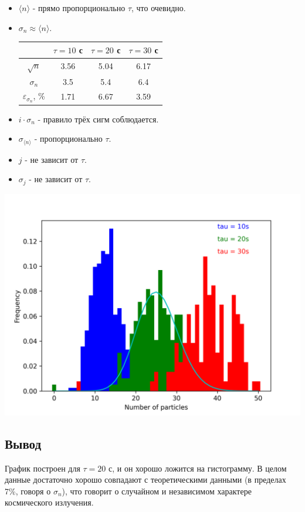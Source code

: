 \documentclass[12pt, a4paper]{article}
\begin{document}
\begin{itemize}
    \item $\langle n \rangle$ - прямо пропорционально $\tau$, что очевидно.
    \item $\sigma_n \approx \langle n \rangle$.
    \begin{center}
        \begin{tabular}{|c|c|c|c|}
            \hline
            & $\tau = 10$ с & $\tau = 20$ с & $\tau = 30$ с \\
            \hline
            $\sqrt{n}$ & 3.56 & 5.04 & 6.17 \\
            \hline
            $\sigma_n$ & 3.5 & 5.4 & 6.4 \\
            \hline
            $\varepsilon_{\sigma_n}$, \% & 1.71 & 6.67 & 3.59 \\ 
            \hline
        \end{tabular}
    \end{center}
    \item $i \cdot \sigma_n$ - правило трёх сигм соблюдается.
    \item $\sigma_{\langle n \rangle}$ - пропорционально $\tau$.
    \item $j$ - не зависит от $\tau$.
    \item $\sigma_j$ - не зависит от $\tau$.
\end{itemize}

\begin{center}
    \includegraphics[width=\textwidth]{Figure good}
\end{center}

\subsection{Вывод}

График построен для $\tau = 20$ с, и он хорошо ложится на гистограмму.
В целом данные достаточно хорошо совпадают с теоретическими данными
(в пределах 7\%, говоря о $\sigma_n$), что говорит о случайном и независимом
характере космического излучения.
\end{document}
